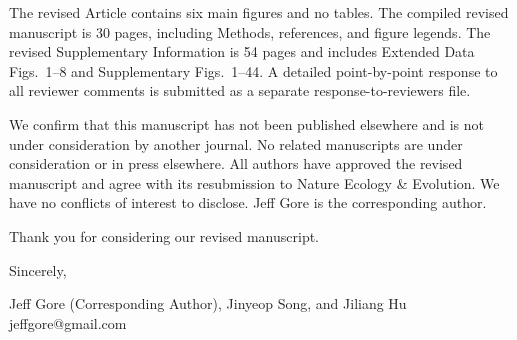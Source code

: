 \documentclass[11pt]{article}
\begin{document}
The revised Article contains six main figures and no tables. The compiled revised manuscript is 30 pages, including Methods, references, and figure legends. The revised Supplementary Information is 54 pages and includes Extended Data Figs.~1--8 and Supplementary Figs.~1--44. A detailed point-by-point response to all reviewer comments is submitted as a separate response-to-reviewers file.

We confirm that this manuscript has not been published elsewhere and is not under consideration by another journal. No related manuscripts are under consideration or in press elsewhere. All authors have approved the revised manuscript and agree with its resubmission to Nature Ecology \& Evolution. We have no conflicts of interest to disclose. Jeff Gore is the corresponding author.

Thank you for considering our revised manuscript.

Sincerely,

Jeff Gore (Corresponding Author), Jinyeop Song, and Jiliang Hu\\
jeffgore@gmail.com
\end{document}
